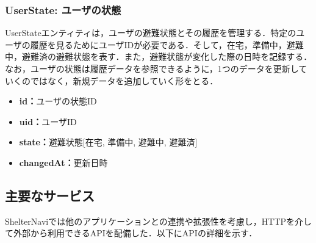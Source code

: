 \documentclass[technicalreport,dvipdfmx]{ieicej}
\begin{document}
\subsubsection{{\bf UserState:} ユーザの状態}
UserStateエンティティは，ユーザの避難状態とその履歴を管理する．特定のユーザの履歴を見るためにユーザIDが必要である．そして，在宅，準備中，避難中，避難済の避難状態を表す．また，避難状態が変化した際の日時を記録する．なお，ユーザの状態は履歴データを参照できるように，1つのデータを更新していくのではなく，新規データを追加していく形をとる．

\begin{itemize}
     \item{\textbf{id：}}ユーザの状態ID
     \item{\textbf{uid：}}ユーザID
     \item{\textbf{state：}}避難状態[在宅, 準備中, 避難中, 避難済]
     \item{\textbf{changedAt：}}更新日時
\end{itemize}



\subsection{主要なサービス}
\label{sec:service}
ShelterNaviでは他のアプリケーションとの連携や拡張性を考慮し，HTTPを介して外部から利用できるAPIを配備した．以下にAPIの詳細を示す．
\end{document}
